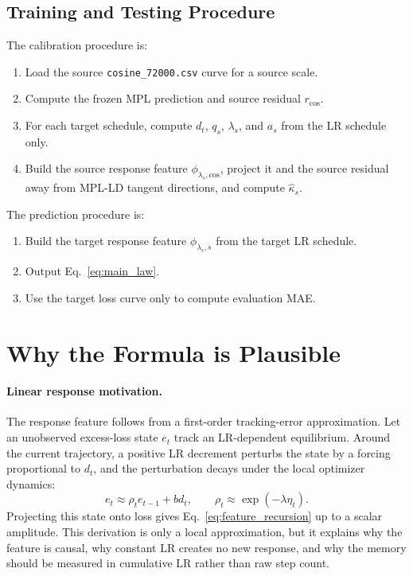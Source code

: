 \documentclass{article}
\newcommand{\code}[1]{\texttt{\small #1}}
\newcommand{\cosine}{\mathrm{cos}}
\begin{document}
\subsection{Training and Testing Procedure}
The calibration procedure is:
\begin{enumerate}\itemsep2pt
  \item Load the source \code{cosine\_72000.csv} curve for a source scale.
  \item Compute the frozen MPL prediction and source residual \(r_{\cosine}\).
  \item For each target schedule, compute \(d_t\), \(q_s\), \(\lambda_s\), and \(a_s\) from
  the LR schedule only.
  \item Build the source response feature \(\phi_{\lambda_s,\cosine}\), project it and the
  source residual away from MPL-LD tangent directions, and compute \(\widehat\kappa_s\).
\end{enumerate}
The prediction procedure is:
\begin{enumerate}\itemsep2pt
  \item Build the target response feature \(\phi_{\lambda_s,s}\) from the target LR schedule.
  \item Output Eq.~\eqref{eq:main_law}.
  \item Use the target loss curve only to compute evaluation MAE.
\end{enumerate}

\section{Why the Formula is Plausible}
\paragraph{Linear response motivation.}
The response feature follows from a first-order tracking-error approximation.  Let an
unobserved excess-loss state \(e_t\) track an LR-dependent equilibrium.  Around the current
trajectory, a positive LR decrement perturbs the state by a forcing proportional to \(d_t\),
and the perturbation decays under the local optimizer dynamics:
\begin{equation}
  e_t \approx \rho_t e_{t-1}+b d_t,\qquad
  \rho_t \approx \exp(-\lambda\eta_t).
\end{equation}
Projecting this state onto loss gives Eq.~\eqref{eq:feature_recursion} up to a scalar
amplitude.  This derivation is only a local approximation, but it explains why the feature is
causal, why constant LR creates no new response, and why the memory should be measured in
cumulative LR rather than raw step count.
\end{document}
